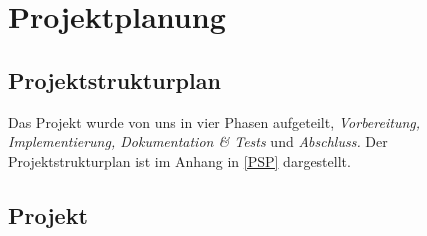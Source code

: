 

\section{Projektplanung}

\subsection{Projektstrukturplan}
Das Projekt wurde von uns in vier Phasen aufgeteilt, \textit{Vorbereitung, Implementierung, Dokumentation \& Tests} und \textit{Abschluss.}
Der Projektstrukturplan ist im Anhang in \cref{PSP} dargestellt.

\subsection{Projekt}
